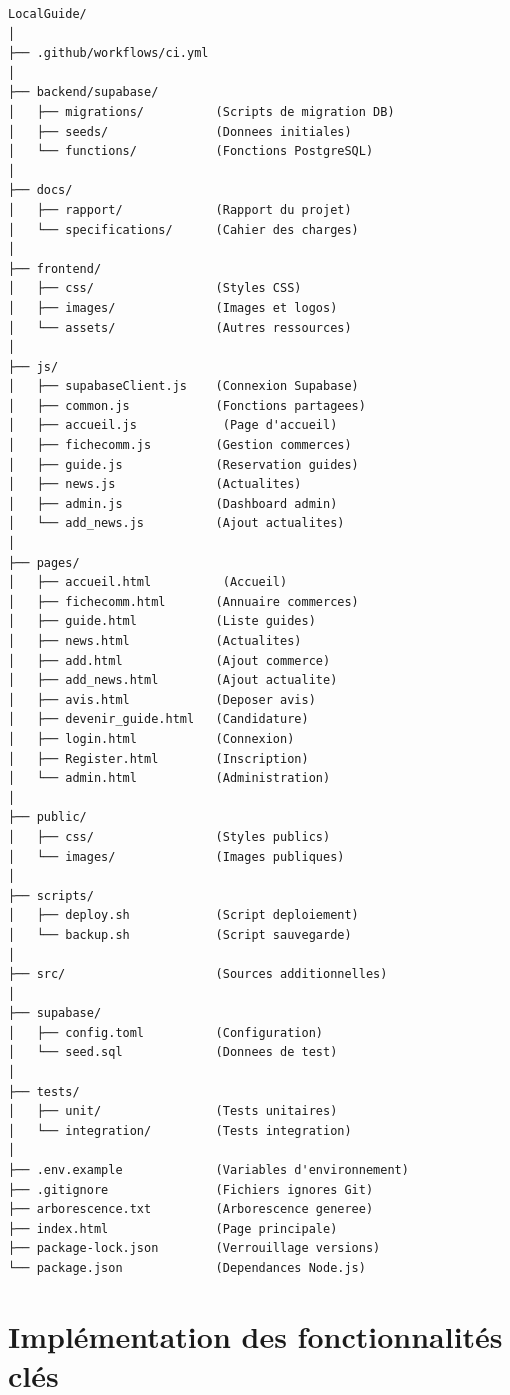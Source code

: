 \documentclass[12pt,a4paper]{report}
\begin{document}
\begin{lstlisting}[basicstyle=\ttfamily\fontsize{12}{14}\selectfont, numbers=none, frame=none, xleftmargin=0pt]
LocalGuide/
│
├── .github/workflows/ci.yml
│
├── backend/supabase/
│   ├── migrations/          (Scripts de migration DB)
│   ├── seeds/               (Donnees initiales)
│   └── functions/           (Fonctions PostgreSQL)
│
├── docs/
│   ├── rapport/             (Rapport du projet)
│   └── specifications/      (Cahier des charges)
│
├── frontend/
│   ├── css/                 (Styles CSS)
│   ├── images/              (Images et logos)
│   └── assets/              (Autres ressources)
│
├── js/
│   ├── supabaseClient.js    (Connexion Supabase)
│   ├── common.js            (Fonctions partagees)
│   ├── accueil.js            (Page d'accueil)
│   ├── fichecomm.js         (Gestion commerces)
│   ├── guide.js             (Reservation guides)
│   ├── news.js              (Actualites)
│   ├── admin.js             (Dashboard admin)
│   └── add_news.js          (Ajout actualites)
│
├── pages/
│   ├── accueil.html          (Accueil)
│   ├── fichecomm.html       (Annuaire commerces)
│   ├── guide.html           (Liste guides)
│   ├── news.html            (Actualites)
│   ├── add.html             (Ajout commerce)
│   ├── add_news.html        (Ajout actualite)
│   ├── avis.html            (Deposer avis)
│   ├── devenir_guide.html   (Candidature)
│   ├── login.html           (Connexion)
│   ├── Register.html        (Inscription)
│   └── admin.html           (Administration)
│
├── public/
│   ├── css/                 (Styles publics)
│   └── images/              (Images publiques)
│
├── scripts/
│   ├── deploy.sh            (Script deploiement)
│   └── backup.sh            (Script sauvegarde)
│
├── src/                     (Sources additionnelles)
│
├── supabase/
│   ├── config.toml          (Configuration)
│   └── seed.sql             (Donnees de test)
│
├── tests/
│   ├── unit/                (Tests unitaires)
│   └── integration/         (Tests integration)
│
├── .env.example             (Variables d'environnement)
├── .gitignore               (Fichiers ignores Git)
├── arborescence.txt         (Arborescence generee)
├── index.html               (Page principale)
├── package-lock.json        (Verrouillage versions)
└── package.json             (Dependances Node.js)
\end{lstlisting}

\section{Implémentation des fonctionnalités clés}
\end{document}
